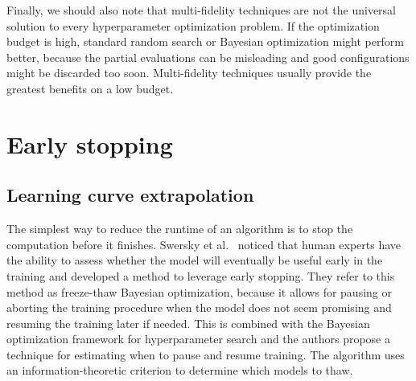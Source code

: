 Finally, we should also note that multi-fidelity techniques are not the universal solution to every hyperparameter optimization problem. If the optimization budget is high, standard random search or Bayesian optimization might perform better, because the partial evaluations can be misleading and good configurations might be discarded too soon. Multi-fidelity techniques usually provide the greatest benefits on a low budget.

\section{Early stopping}

\subsection{Learning curve extrapolation}
The simplest way to reduce the runtime of an algorithm is to stop the computation before it finishes. Swersky et al.~\cite{swersky2014freeze} noticed that human experts have the ability to assess whether the model will eventually be useful early in the training and developed a method to leverage early stopping. They refer to this method as freeze-thaw Bayesian optimization, because it allows for pausing or aborting the training procedure when the model does not seem promising and resuming the training later if needed. This is combined with the Bayesian optimization framework for hyperparameter search and the authors propose a technique for estimating when to pause and resume training. The algorithm uses an information-theoretic criterion to determine which models to thaw.

